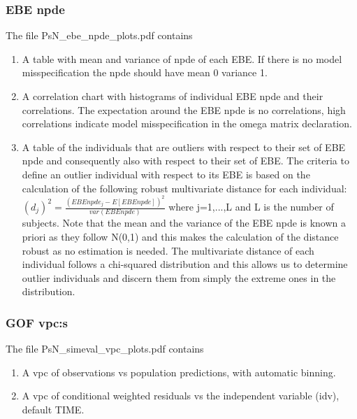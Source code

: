\subsubsection{EBE npde}
\noindent The file PsN\_ebe\_npde\_plots.pdf contains
\begin{enumerate}
\item A table with mean and variance of npde of each EBE. If there is no model
misspecification the npde should have mean 0 variance 1.
\item A correlation chart with histograms of individual EBE npde and their
correlations. The expectation around the EBE npde is no correlations, high correlations indicate model misspecification in the omega matrix declaration.
\item A table of the individuals that are outliers with respect to their set of EBE npde and consequently also with respect to their set of EBE. The criteria to define an outlier individual with respect to its EBE is based on the calculation of the following robust multivariate distance for each individual:
$(d_{j})^2=\frac{(EBEnpde_{j} - E[EBEnpde])^2}{var(EBEnpde)}$
where j=1,...,L and L is the number of subjects. Note that the mean and the variance of the EBE npde is known a priori as they follow N(0,1) and this makes the calculation of the distance robust as no estimation is needed. The multivariate distance of each individual follows a chi-squared distribution and this allows us to determine outlier individuals and discern them from simply the extreme ones in the distribution.
\end{enumerate}

\subsubsection{GOF vpc:s}
\noindent The file PsN\_simeval\_vpc\_plots.pdf contains
\begin{enumerate}
\item A vpc of observations vs population predictions, with automatic binning.
\item A vpc of conditional weighted residuals vs the independent variable (idv), default TIME.
\end{enumerate}


